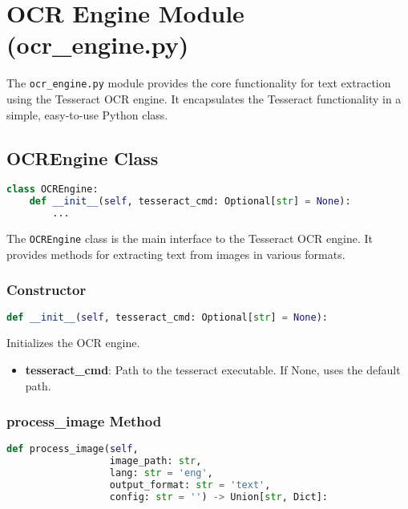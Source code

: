 \section{OCR Engine Module (ocr\_engine.py)}

The \texttt{ocr\_engine.py} module provides the core functionality for text extraction using the Tesseract OCR engine. It encapsulates the Tesseract functionality in a simple, easy-to-use Python class.

\subsection{OCREngine Class}

\begin{lstlisting}[language=Python]
class OCREngine:
    def __init__(self, tesseract_cmd: Optional[str] = None):
        ...
\end{lstlisting}

The \texttt{OCREngine} class is the main interface to the Tesseract OCR engine. It provides methods for extracting text from images in various formats.

\subsubsection{Constructor}

\begin{lstlisting}[language=Python]
def __init__(self, tesseract_cmd: Optional[str] = None):
\end{lstlisting}

Initializes the OCR engine.

\begin{itemize}
  \item \textbf{tesseract\_cmd}: Path to the tesseract executable. If None, uses the default path.
\end{itemize}

\subsubsection{process\_image Method}

\begin{lstlisting}[language=Python]
def process_image(self, 
                  image_path: str, 
                  lang: str = 'eng',
                  output_format: str = 'text',
                  config: str = '') -> Union[str, Dict]:
\end{lstlisting}

